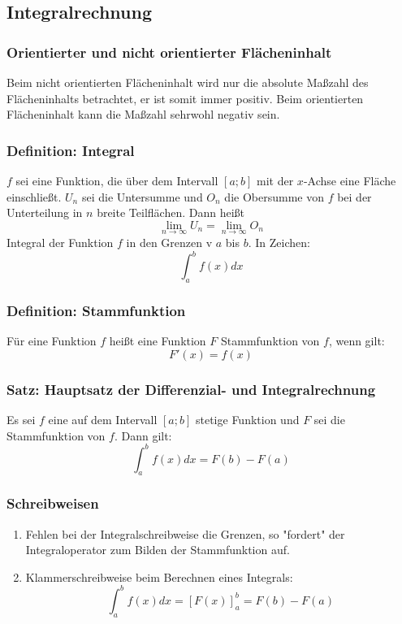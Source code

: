 \documentclass{article}
\begin{document}
  \subsection{Integralrechnung}
  
  \subsubsection{Orientierter und nicht orientierter Flächeninhalt}
  Beim nicht orientierten Flächeninhalt wird nur die absolute Maßzahl des Flächeninhalts betrachtet, er ist somit immer positiv. Beim orientierten Flächeninhalt kann die Maßzahl sehrwohl negativ sein.
  
  \subsubsection{Definition: Integral}
  $f$ sei eine Funktion, die über dem Intervall $[a; b]$ mit der $x$-Achse eine Fläche einschließt. $U_n$ sei die Untersumme und $O_n$ die Obersumme von $f$ bei der Unterteilung in $n$ breite Teilflächen. Dann heißt
  \begin{equation*}
  	\lim\limits_{n \to \infty} U_n = \lim\limits_{n \to \infty} O_n
  \end{equation*}
  Integral der Funktion $f$ in den Grenzen v $a$ bis $b$. In Zeichen: 
  \begin{equation*}
  	\int^b_a f(x) dx
  \end{equation*}
  
   \subsubsection{Definition: Stammfunktion}
  Für eine Funktion $f$ heißt eine Funktion $F$ Stammfunktion von $f$, wenn gilt:
  \begin{equation*}
  	F'(x) = f(x)
  \end{equation*}
  
  \subsubsection{Satz: Hauptsatz der Differenzial- und Integralrechnung}
  Es sei $f$ eine auf dem Intervall $[a; b]$ stetige Funktion und $F$ sei die Stammfunktion von $f$. Dann gilt: 
  \begin{equation*}
  	\int^b_a f(x) dx = F(b) - F(a)
  \end{equation*}
  
  \subsubsection{Schreibweisen}
  \begin{enumerate}
  	\item Fehlen bei der Integralschreibweise die Grenzen, so "fordert" der Integraloperator zum Bilden der Stammfunktion auf. 
  	\item Klammerschreibweise beim Berechnen eines Integrals: 
  	\begin{equation*}
  		\int^b_a f(x) dx = [F(x)]^b_a = F(b) - F(a)
  	\end{equation*}
  \end{enumerate}
  
\end{document}
